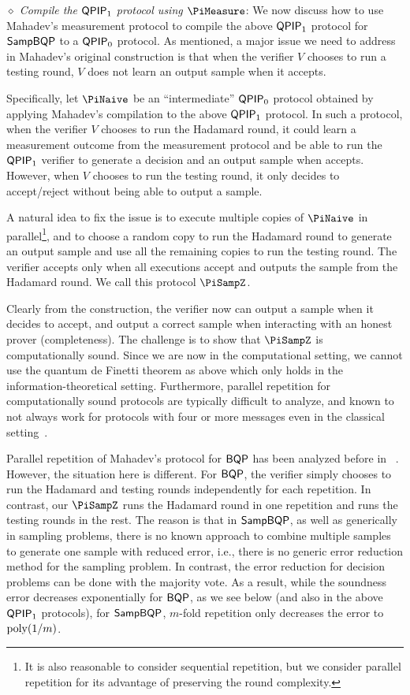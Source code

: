 \emph{$\diamond$ Compile the $\operatorname{\mathsf{QPIP}}_1$ protocol using $\PiMeasure$}: We now discuss how to use Mahadev's measurement protocol to compile the above $\operatorname{\mathsf{QPIP}}_1$ protocol for $\operatorname{\mathsf{SampBQP}}$ to a $\operatorname{\mathsf{QPIP}}_0$ protocol. As mentioned, a major issue we need to address in Mahadev's original construction is that when the verifier $V$ chooses to run a testing round, $V$ does not learn an output sample when it accepts.  %

Specifically, let $\PiNaive$ be an ``intermediate'' $\operatorname{\mathsf{QPIP}}_0$ protocol obtained by applying Mahadev's compilation to the above $\operatorname{\mathsf{QPIP}}_1$ protocol. In such a protocol, when the verifier $V$ chooses to run the Hadamard round, it could learn a measurement outcome from the measurement protocol and be able to run the $\operatorname{\mathsf{QPIP}}_1$ verifier to generate a decision and an output sample when accepts. However, when  $V$ chooses to run the testing round, it only decides to accept/reject without being able to output a sample. 

 A natural idea to fix the issue is to execute multiple copies of $\PiNaive$ in parallel\footnote{It is also reasonable to consider sequential repetition, but we consider parallel repetition for its advantage of preserving the round complexity.}, and to choose a random copy to run the Hadamard round to generate an output sample and use all the remaining copies to run the testing round. The verifier accepts only when all executions accept and outputs the sample from the Hadamard round. We call this protocol $\PiSampZ$.

Clearly from the construction, the verifier now can output a sample when it decides to accept, and output a correct sample when interacting with an honest prover (completeness). The challenge is to show that $\PiSampZ$ is computationally sound. Since we are now in the computational setting, we cannot use the quantum de Finetti theorem as above which only holds in the information-theoretical setting. Furthermore, parallel repetition for computationally sound protocols are typically difficult to analyze, and known to not always work for protocols with four or more messages even in the classical setting~\cite{BIN97,PW12}.


 Parallel repetition of Mahadev's protocol for $\operatorname{\mathsf{BQP}}$ has been analyzed before in ~\cite{arXiv:ChiaChungYam19, arXiv:AlaChiHun19}. However, the situation here is different. 
 For $\operatorname{\mathsf{BQP}}$, the verifier simply chooses to run the Hadamard and testing rounds independently for each repetition.
 In contrast, our $\PiSampZ$ runs the Hadamard round in one repetition and runs the testing rounds in the rest. The reason is that in $\operatorname{\mathsf{SampBQP}}$, as well as generically in sampling problems, there is no known approach to combine multiple samples to generate one sample with reduced error, i.e., there is no generic error reduction method for the sampling problem. 
In contrast, the error reduction for decision problems can be done with the majority vote. 
As a result, while the soundness error decreases exponentially for $\operatorname{\mathsf{BQP}}$, as we see below (and also in the above $\operatorname{\mathsf{QPIP}}_1$ protocols), for $\operatorname{\mathsf{SampBQP}}$, $m$-fold repetition only decreases the error to $\operatorname*{\operatorname{poly}}(1/m)$. 

